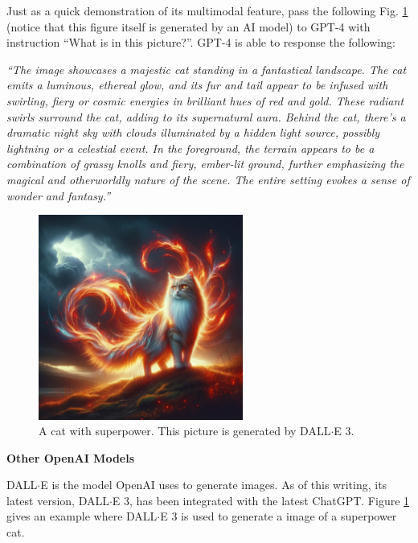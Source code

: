Just as a quick demonstration of its multimodal feature, pass the following Fig. \ref{fig:superpower_cat} (notice that this figure itself is generated by an AI model) to GPT-4 with instruction ``What is in this picture?''. GPT-4 is able to response the following:

\vspace{0.1in}
\noindent \textit{``The image showcases a majestic cat standing in a fantastical landscape. The cat emits a luminous, ethereal glow, and its fur and tail appear to be infused with swirling, fiery or cosmic energies in brilliant hues of red and gold. These radiant swirls surround the cat, adding to its supernatural aura. Behind the cat, there's a dramatic night sky with clouds illuminated by a hidden light source, possibly lightning or a celestial event. In the foreground, the terrain appears to be a combination of grassy knolls and fiery, ember-lit ground, further emphasizing the magical and otherworldly nature of the scene. The entire setting evokes a sense of wonder and fantasy.''}
\vspace{0.1in}

\begin{figure}[!htb]
	\centering
	\includegraphics[width=0.6\textwidth]{./chapters/part-4/figures/superpower_cat.png}
	\caption{A cat with superpower. This picture is generated by DALL$\cdot$E 3.}
	\label{fig:superpower_cat}
\end{figure}

\vspace{0.1in}
\noindent \textbf{Other OpenAI Models}
\vspace{0.1in}

DALL$\cdot$E is the model OpenAI uses to generate images. As of this writing, its latest version, DALL$\cdot$E 3, has been integrated with the latest ChatGPT. Figure \ref{fig:superpower_cat} gives an example where DALL$\cdot$E 3 is used to generate a image of a superpower cat.

